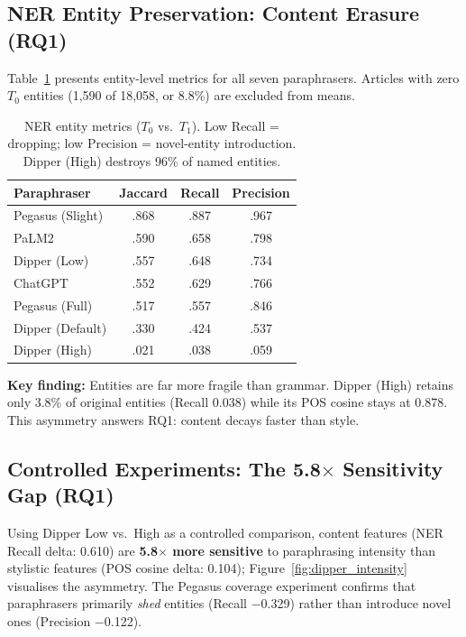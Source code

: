 \subsection{NER Entity Preservation: Content Erasure (RQ1)}

Table~\ref{tab:ner_metrics} presents entity-level metrics for all seven paraphrasers. Articles with zero $T_0$ entities (1,590 of 18,058, or 8.8\%) are excluded from means.

\begin{table}[h]
\centering
\small
\begin{tabular}{lccc}
\toprule
\textbf{Paraphraser} & \textbf{Jaccard} & \textbf{Recall} & \textbf{Precision} \\
\midrule
Pegasus (Slight) & .868 & .887 & .967 \\
PaLM2 & .590 & .658 & .798 \\
Dipper (Low) & .557 & .648 & .734 \\
ChatGPT & .552 & .629 & .766 \\
Pegasus (Full) & .517 & .557 & .846 \\
Dipper (Default) & .330 & .424 & .537 \\
Dipper (High) & .021 & .038 & .059 \\
\bottomrule
\end{tabular}
\caption{NER entity metrics ($T_0$ vs.\ $T_1$). Low Recall = dropping; low Precision = novel-entity introduction. Dipper (High) destroys 96\% of named entities.}
\label{tab:ner_metrics}
\end{table}

\textbf{Key finding:} Entities are far more fragile than grammar. Dipper (High) retains only 3.8\% of original entities (Recall 0.038) while its POS cosine stays at 0.878. This asymmetry answers RQ1: content decays faster than style.

\subsection{Controlled Experiments: The 5.8$\times$ Sensitivity Gap (RQ1)}

Using Dipper Low vs.\ High as a controlled comparison, content features (NER Recall delta: 0.610) are \textbf{5.8$\times$ more sensitive} to paraphrasing intensity than stylistic features (POS cosine delta: 0.104); Figure~\ref{fig:dipper_intensity} visualises the asymmetry. The Pegasus coverage experiment confirms that paraphrasers primarily \emph{shed} entities (Recall $-$0.329) rather than introduce novel ones (Precision $-$0.122).

